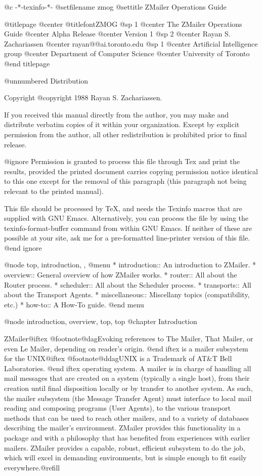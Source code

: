    @c -*-texinfo-*-
@setfilename zmog
@settitle ZMailer Operations Guide

@titlepage
@center @titlefont{ZMOG}
@sp 1
@center The ZMailer Operations Guide
@center Alpha Release
@center Version 1
@sp 2
@center Rayan S. Zachariassen
@center rayan@@ai.toronto.edu
@sp 1
@center Artificial Intelligence group
@center Department of Computer Science
@center University of Toronto
@end titlepage

@unnumbered Distribution

Copyright @copyright{} 1988 Rayan S. Zachariassen.

If you received this manual directly from the author, you may make and
distribute verbatim copies of it within your organization.  Except by
explicit permission from the author, all other redistribution is prohibited
prior to final release.

@ignore
Permission is granted to process this file through Tex and print the
results, provided the printed document carries copying permission
notice identical to this one except for the removal of this paragraph
(this paragraph not being relevant to the printed manual).

This file should be processed by TeX, and needs the Texinfo macros that
are supplied with GNU Emacs.  Alternatively, you can process the file by
using the texinfo-format-buffer command from within GNU Emacs.  If neither
of these are possible at your site, ask me for a pre-formatted line-printer
version of this file.
@end ignore

@node top, introduction, ,
@menu
* introduction::    An introduction to ZMailer.
* overview::        General overview of how ZMailer works.
* router::          All about the Router process.
* scheduler::       All about the Scheduler process.
* transports::      All about the Transport Agents.
* miscellaneous::   Miscellany topics (compatibility, etc.)
* how-to::          A How-To guide.
@end menu

@node introduction, overview, top, top
@chapter Introduction

ZMailer@iftex
@footnote{@dag}{Evoking references to The Mailer, That Mailer,
or even Le Mailer, depending on reader's origin.}
@end iftex
is a mailer subsystem for the UNIX@iftex
@footnote{@ddag}{UNIX is a Trademark of AT&T Bell Laboratories.}
@end iftex
operating system.
A mailer is in charge of handling all mail messages that are created on
a system (typically a single host), from their creation until final
disposition locally or by transfer to another system. As such, the
mailer subsystem (the Message Transfer Agent) must interface to local
mail reading and composing programs (User Agents), to the various
transport methods that can be used to reach other mailers, and to a
variety of databases describing the mailer's environment. ZMailer
provides this functionality in a package and with a philosophy that has
benefited from experiences with earlier mailers. ZMailer provides a
capable, robust, efficient subsystem to do the job, which will excel in
demanding environments, but is simple enough to fit easily everywhere.@refill

